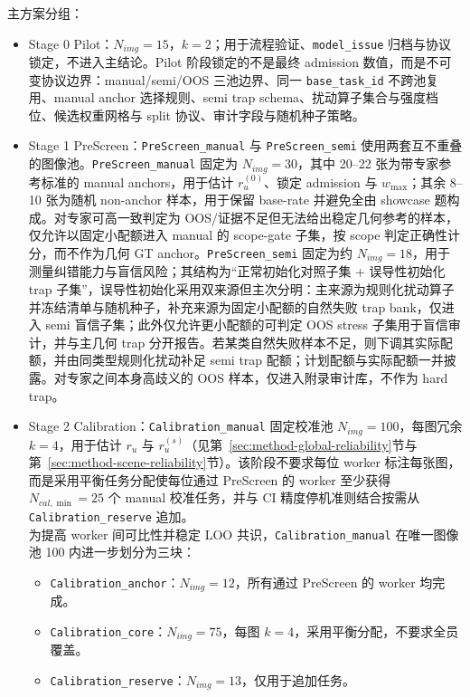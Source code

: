 主方案分组：
\begin{itemize}
    \item Stage 0 Pilot：$N_{img}=15$，$k=2$；用于流程验证、\texttt{model\_issue} 归档与协议锁定，不进入主结论。Pilot 阶段锁定的不是最终 admission 数值，而是不可变协议边界：manual/semi/OOS 三池边界、同一 \texttt{base\_task\_id} 不跨池复用、manual anchor 选择规则、semi trap schema、扰动算子集合与强度档位、候选权重网格与 split 协议、审计字段与随机种子策略。
    \item Stage 1 PreScreen：\texttt{PreScreen\_manual} 与 \texttt{PreScreen\_semi} 使用两套互不重叠的图像池。\texttt{PreScreen\_manual} 固定为 $N_{img}=30$，其中 20--22 张为带专家参考标准的 manual anchors，用于估计 $r_u^{\left(0\right)}$、锁定 admission 与 $w_{\max}$；其余 8--10 张为随机 non-anchor 样本，用于保留 base-rate 并避免全由 showcase 题构成。对专家可高一致判定为 OOS/证据不足但无法给出稳定几何参考的样本，仅允许以固定小配额进入 manual 的 scope-gate 子集，按 scope 判定正确性计分，而不作为几何 GT anchor。\texttt{PreScreen\_semi} 固定为约 $N_{img}=18$，用于测量纠错能力与盲信风险；其结构为“正常初始化对照子集 + 误导性初始化 trap 子集”，误导性初始化采用双来源但主次分明：主来源为规则化扰动算子并冻结清单与随机种子，补充来源为固定小配额的自然失败 trap bank，仅进入 semi 盲信子集；此外仅允许更小配额的可判定 OOS stress 子集用于盲信审计，并与主几何 trap 分开报告。若某类自然失败样本不足，则下调其实际配额，并由同类型规则化扰动补足 semi trap 配额；计划配额与实际配额一并披露。对专家之间本身高歧义的 OOS 样本，仅进入附录审计库，不作为 hard trap。
    \item Stage 2 Calibration：\texttt{Calibration\_manual} 固定校准池 $N_{img}=100$，每图冗余 $k=4$，用于估计 $r_u$ 与 $r_u^{\left(s\right)}$（见第~\ref{sec:method-global-reliability}节与第~\ref{sec:method-scene-reliability}节）。该阶段不要求每位 worker 标注每张图，而是采用平衡任务分配使每位通过 PreScreen 的 worker 至少获得 $N_{cal,\min}=25$ 个 manual 校准任务，并与 CI 精度停机准则结合按需从 \texttt{Calibration\_reserve} 追加。
    \\
    为提高 worker 间可比性并稳定 LOO 共识，\texttt{Calibration\_manual} 在唯一图像池 100 内进一步划分为三块：
    \begin{itemize}
        \item \texttt{Calibration\_anchor}：$N_{img}=12$，所有通过 PreScreen 的 worker 均完成。
        \item \texttt{Calibration\_core}：$N_{img}=75$，每图 $k=4$，采用平衡分配，不要求全员覆盖。
        \item \texttt{Calibration\_reserve}：$N_{img}=13$，仅用于追加任务。

\end{itemize}
\end{itemize}
